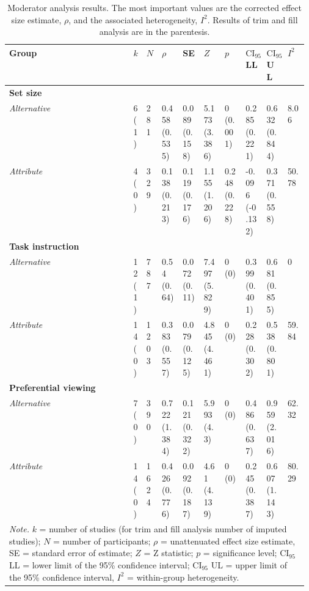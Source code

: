 \begin{table}[ht]
\centering
\caption{Moderator analysis results. The most important values are the corrected effect size estimate, $\rho$, and the associated heterogeneity, $I^2$. Results of trim and fill analysis are in the parentesis.} 
\label{tab:mod_results}
\begingroup\small
\begin{tabular}{lp{0.03\linewidth}p{0.05\linewidth}p{0.07\linewidth}p{0.07\linewidth}p{0.07\linewidth}p{0.07\linewidth}p{0.07\linewidth}p{0.07\linewidth}p{0.07\linewidth}}
  \hline
Group & $k$ & $N$ & $\rho$ & SE & $Z$ & $p$ & $\textrm{CI}_{95}$ LL & $\textrm{CI}_{95}$ UL & $I^2$ \\ 
  \hline
\textbf{Set size} &  &  &  &  &  &  &  &  &  \\ 
  \hspace{2mm}\textit{Alternative} & 6 (1) & 281 & 0.458 (0.535) & 0.089 (0.158) & 5.173 (3.386) & 0 (0.001) & 0.285 (0.221) & 0.632 (0.844) & 8.06 \\ 
  \hspace{2mm}\textit{Attribute} & 4 (0) & 329 & 0.138 (0.213) & 0.119 (0.176) & 1.155 (1.206) & 0.248 (0.228) & -0.096 (-0.132) & 0.371 (0.558) & 50.78 \\ 
  \textbf{Task instruction} &  &  &  &  &  &  &  &  &  \\ 
  \hspace{2mm}\textit{Alternative} & 12 (1) & 787 & 0.54 (0.64) & 0.072 (0.11) & 7.497 (5.829) & 0 (0) & 0.399 (0.401) & 0.681 (0.855) & 0 \\ 
  \hspace{2mm}\textit{Attribute} & 14 (0) & 1203 & 0.383 (0.557) & 0.079 (0.125) & 4.845 (4.461) & 0 (0) & 0.228 (0.302) & 0.538 (0.801) & 59.84 \\ 
  \textbf{Preferential viewing} &  &  &  &  &  &  &  &  &  \\ 
  \hspace{2mm}\textit{Alternative} & 7 (0) & 390 & 0.722 (1.384) & 0.121 (0.322) & 5.993 (4.3) & 0 (0) & 0.486 (0.637) & 0.959 (2.016) & 62.32 \\ 
  \hspace{2mm}\textit{Attribute} & 14 (0) & 1624 & 0.426 (0.776) & 0.092 (0.187) & 4.61 (4.139) & 0 (0) & 0.245 (0.387) & 0.607 (1.143) & 80.29 \\ 
   \hline 
 \multicolumn{10}{p{0.9\textwidth}}{\scriptsize{\textit{Note.} $k$ = number of studies (for trim and fill analysis number of imputed studies); $N$ = number of participants; $\rho$ = unattenuated effect size estimate, SE = standard error of estimate; $Z$ = Z statistic; $p$ = significance level; $\textrm{CI}_{95}$ LL = lower limit of the 95\% confidence interval; $\textrm{CI}_{95}$ UL = upper limit of the 95\% confidence interval, $I^2$ = within-group heterogeneity.}} 
\end{tabular}
\endgroup
\end{table}
